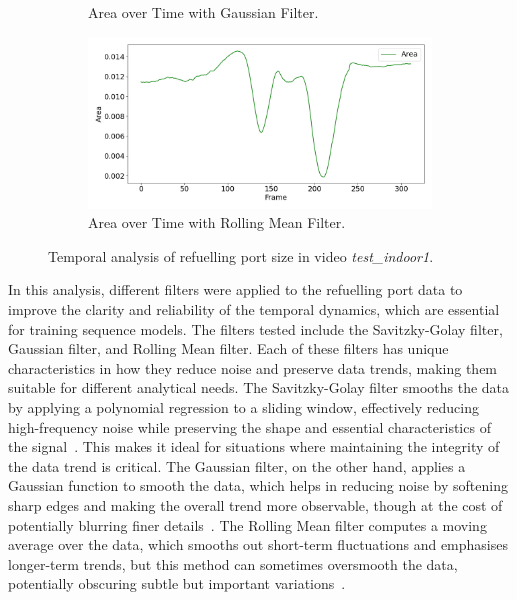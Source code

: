 \documentclass[12pt,oneside]{book} %
\begin{document}
\begin{figure}[H]
\begin{subfigure}[t]{0.65\textwidth}
        \caption{Area over Time with Gaussian Filter.}
        \label{fig:size-test-indoor1-gaussian}
    \end{subfigure}
    \hfill
    \begin{subfigure}[t]{0.65\textwidth}
        \includegraphics[width=\textwidth]{figures/bbox_metrics/test_indoor1 (Rolling Mean Filter)_area.png}
        \caption{Area over Time with Rolling Mean Filter.}
        \label{fig:size-test-indoor1-rolling}
    \end{subfigure}
    \caption{Temporal analysis of refuelling port size in video \textit{test\_indoor1}.}
    \label{fig:size-test-indoor1}
\end{figure}

In this analysis, different filters were applied to the refuelling port data to
improve the clarity and reliability of the temporal dynamics, which are
essential for training sequence models. The filters tested include the
Savitzky-Golay filter, Gaussian filter, and Rolling Mean filter. Each of these
filters has unique characteristics in how they reduce noise and preserve data
trends, making them suitable for different analytical needs. The Savitzky-Golay
filter smooths the data by applying a polynomial regression to a sliding
window, effectively reducing high-frequency noise while preserving the shape
and essential characteristics of the signal~\cite{Savitzky1964, 5888646}. This
makes it ideal for situations where maintaining the integrity of the data trend
is critical. The Gaussian filter, on the other hand, applies a Gaussian
function to smooth the data, which helps in reducing noise by softening sharp
edges and making the overall trend more observable, though at the cost of
potentially blurring finer details~\cite{8378142}. The Rolling Mean filter
computes a moving average over the data, which smooths out short-term
fluctuations and emphasises longer-term trends, but this method can sometimes
oversmooth the data, potentially obscuring subtle but important
variations~\cite{smith1999dsp}. 
\end{document}
